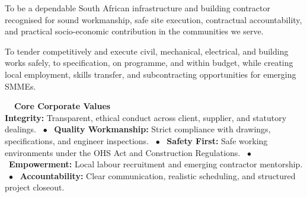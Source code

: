 \documentclass[a4paper,11pt]{article}
\providecommand{\faBalanceScale}{\faBalanceScaleLeft}
\begin{document}
\vfill

\noindent
\begin{minipage}[t]{0.485\textwidth}
    \begin{tcolorbox}[
        enhanced, colback=white, colframe=mhlightgray, boxrule=0.8pt, arc=4pt,
        title={\bfseries\color{white}\faEye\ Vision},
        colbacktitle=mhnavy, fonttitle=\bfseries\small,
        left=8pt, right=8pt, top=7pt, bottom=7pt,
        drop shadow=black!4
    ]
        {\fontsize{8.3pt}{11.6pt}\selectfont\color{mhtext}
        To be a dependable South African infrastructure and building contractor recognised for sound workmanship, safe site execution, contractual accountability, and practical socio-economic contribution in the communities we serve.
        }
    \end{tcolorbox}
\end{minipage}
\hfill
\begin{minipage}[t]{0.485\textwidth}
    \begin{tcolorbox}[
        enhanced, colback=white, colframe=mhlightgray, boxrule=0.8pt, arc=4pt,
        title={\bfseries\color{white}\faBullseye\ Mission},
        colbacktitle=mhblue, fonttitle=\bfseries\small,
        left=8pt, right=8pt, top=7pt, bottom=7pt,
        drop shadow=black!4
    ]
        {\fontsize{8.3pt}{11.6pt}\selectfont\color{mhtext}
        To tender competitively and execute civil, mechanical, electrical, and building works safely, to specification, on programme, and within budget, while creating local employment, skills transfer, and subcontracting opportunities for emerging SMMEs.
        }
    \end{tcolorbox}
\end{minipage}

\vfill

\noindent
\begin{tcolorbox}[
    enhanced, colback=mhoffwhite, colframe=mhlightgray, boxrule=0.8pt, arc=4pt,
    left=8pt, right=8pt, top=6pt, bottom=6pt,
    borderline west={3.0pt}{0pt}{mhgold}, drop shadow=black!3
]
    {\fontsize{8.4pt}{10.6pt}\selectfont\bfseries\color{mhnavy}\faBalanceScale\ \ Core Corporate Values}\\[3pt]
    {\fontsize{7.8pt}{10.6pt}\selectfont\color{mhtext}
    \textbf{Integrity:} Transparent, ethical conduct across client, supplier, and statutory dealings. \ $\bullet$ \
    \textbf{Quality Workmanship:} Strict compliance with drawings, specifications, and engineer inspections. \ $\bullet$ \
    \textbf{Safety First:} Safe working environments under the OHS Act and Construction Regulations. \ $\bullet$ \
    \textbf{Empowerment:} Local labour recruitment and emerging contractor mentorship. \ $\bullet$ \
    \textbf{Accountability:} Clear communication, realistic scheduling, and structured project closeout.
    }
\end{tcolorbox}
\end{document}

